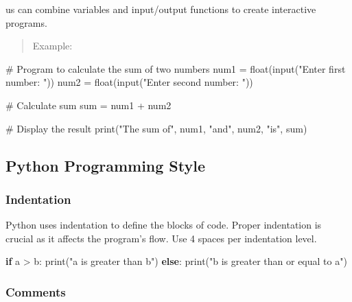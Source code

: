 \documentclass[
  letterpaper,
  DIV=11,
  numbers=noendperiod]{scrreprt}
\newenvironment{Shaded}{\begin{snugshade}}{\end{snugshade}}
\newcommand{\BuiltInTok}[1]{\textcolor[rgb]{0.00,0.23,0.31}{#1}}
\newcommand{\CommentTok}[1]{\textcolor[rgb]{0.37,0.37,0.37}{#1}}
\newcommand{\ControlFlowTok}[1]{\textcolor[rgb]{0.00,0.23,0.31}{\textbf{#1}}}
\newcommand{\NormalTok}[1]{\textcolor[rgb]{0.00,0.23,0.31}{#1}}
\newcommand{\OperatorTok}[1]{\textcolor[rgb]{0.37,0.37,0.37}{#1}}
\newcommand{\StringTok}[1]{\textcolor[rgb]{0.13,0.47,0.30}{#1}}
\theoremstyle{plain}
\theoremstyle{definition}
\theoremstyle{remark}
\begin{document}
us can combine variables and input/output functions to create
interactive programs.

\begin{quote}
Example:
\end{quote}

\begin{Shaded}
\begin{Highlighting}[]
\CommentTok{\# Program to calculate the sum of two numbers}
\NormalTok{num1 }\OperatorTok{=} \BuiltInTok{float}\NormalTok{(}\BuiltInTok{input}\NormalTok{(}\StringTok{"Enter first number: "}\NormalTok{))}
\NormalTok{num2 }\OperatorTok{=} \BuiltInTok{float}\NormalTok{(}\BuiltInTok{input}\NormalTok{(}\StringTok{"Enter second number: "}\NormalTok{))}

\CommentTok{\# Calculate sum}
\BuiltInTok{sum} \OperatorTok{=}\NormalTok{ num1 }\OperatorTok{+}\NormalTok{ num2}

\CommentTok{\# Display the result}
\BuiltInTok{print}\NormalTok{(}\StringTok{"The sum of"}\NormalTok{, num1, }\StringTok{"and"}\NormalTok{, num2, }\StringTok{"is"}\NormalTok{, }\BuiltInTok{sum}\NormalTok{)}
\end{Highlighting}
\end{Shaded}

\subsection{Python Programming Style}\label{python-programming-style}

\subsubsection{Indentation}\label{indentation}

Python uses indentation to define the blocks of code. Proper indentation
is crucial as it affects the program's flow. Use 4 spaces per
indentation level.

\begin{Shaded}
\begin{Highlighting}[]
\ControlFlowTok{if}\NormalTok{ a }\OperatorTok{\textgreater{}}\NormalTok{ b:}
    \BuiltInTok{print}\NormalTok{(}\StringTok{"a is greater than b"}\NormalTok{)}
\ControlFlowTok{else}\NormalTok{:}
    \BuiltInTok{print}\NormalTok{(}\StringTok{"b is greater than or equal to a"}\NormalTok{)}
\end{Highlighting}
\end{Shaded}

\subsubsection{Comments}\label{comments}
\end{document}
